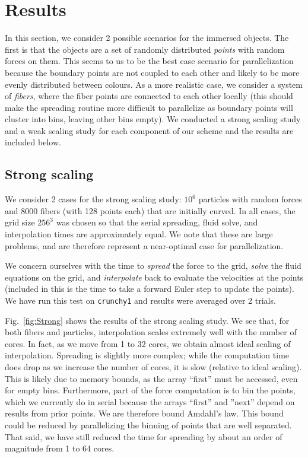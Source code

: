 \documentclass[]{article}
\begin{document}
\section{Results}
In this section, we consider 2 possible scenarios for the immersed objects. The first is that the objects are a set of randomly distributed \textit{points} with random forces on them. This seems to us to be the best case scenario for parallelization because the boundary points are not coupled to each other and likely to be more evenly distributed between colours. As a more realistic case, we consider a system of \textit{fibers}, where the fiber points are connected to each other locally (this should make the spreading routine more difficult to parallelize as boundary points will cluster into bins, leaving other bins empty). We conducted a strong scaling study and a weak scaling study for each component of our scheme and the results are included below.

\subsection{Strong scaling}
We consider 2 cases for the strong scaling study: $10^6$ particles with random forces and 8000 fibers (with 128 points each) that are initially curved. In all cases, the grid size $256^3$ was chosen so that the serial spreading, fluid solve, and interpolation times are approximately equal. We note that these are large problems, and are therefore represent a near-optimal case for parallelization. 

We concern ourselves with the time to \textit{spread} the force to the grid, \textit{solve} the fluid equations on the grid, and \textit{interpolate} back to evaluate the velocities at the points (included in this is the time to take a forward Euler step to update the points). We have run this test on \texttt{crunchy1} and results were averaged over 2 trials. 

Fig.\ \ref{fig:Strong} shows the results of the strong scaling study. We see that, for both fibers and particles, interpolation scales extremely well with the number of cores. In fact, as we move from 1 to 32 cores, we obtain almost ideal scaling of interpolation. Spreading is slightly more complex; while the computation time does drop as we increase the number of cores, it is slow (relative to ideal scaling). This is likely due to memory bounds, as the array ``first'' must be accessed, even for empty bins. Furthermore, part of the force computation is to bin the points, which we currently do in serial because the arrays ``first'' and ''next'' depend on results from prior points. We are therefore bound Amdahl's law. This bound could be reduced by parallelizing the binning of points that are well separated. That said, we have still reduced the time for spreading by about an order of magnitude from 1 to 64 cores. 
\end{document}
